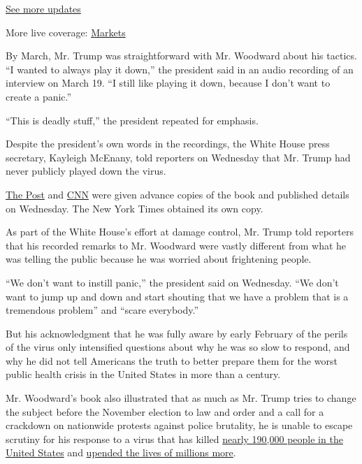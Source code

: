 \href{https://www.nytimes3xbfgragh.onion/2020/09/11/world/covid-19-coronavirus.html?action=click\&pgtype=Article\&state=default\&region=MAIN_CONTENT_1\&context=storylines_live_updates}{See
more updates}

More live coverage:
\href{https://www.nytimes3xbfgragh.onion/live/2020/09/11/business/stock-market-today-coronavirus?action=click\&pgtype=Article\&state=default\&region=MAIN_CONTENT_1\&context=storylines_live_updates}{Markets}

By March, Mr. Trump was straightforward with Mr. Woodward about his
tactics. ``I wanted to always play it down,'' the president said in an
audio recording of an interview on March 19. ``I still like playing it
down, because I don't want to create a panic.''

``This is deadly stuff,'' the president repeated for emphasis.

Despite the president's own words in the recordings, the White House
press secretary, Kayleigh McEnany, told reporters on Wednesday that Mr.
Trump had never publicly played down the virus.

\href{https://www.washingtonpost.com/politics/bob-woodward-rage-book-trump/2020/09/09/0368fe3c-efd2-11ea-b4bc-3a2098fc73d4_story.html}{The
Post} and
\href{https://www.cnn.com/2020/09/09/politics/bob-woodward-rage-book-trump-coronavirus/index.html}{CNN}
were given advance copies of the book and published details on
Wednesday. The New York Times obtained its own copy.

As part of the White House's effort at damage control, Mr. Trump told
reporters that his recorded remarks to Mr. Woodward were vastly
different from what he was telling the public because he was worried
about frightening people.

``We don't want to instill panic,'' the president said on Wednesday.
``We don't want to jump up and down and start shouting that we have a
problem that is a tremendous problem'' and ``scare everybody.''

But his acknowledgment that he was fully aware by early February of the
perils of the virus only intensified questions about why he was so slow
to respond, and why he did not tell Americans the truth to better
prepare them for the worst public health crisis in the United States in
more than a century.

Mr. Woodward's book also illustrated that as much as Mr. Trump tries to
change the subject before the November election to law and order and a
call for a crackdown on nationwide protests against police brutality, he
is unable to escape scrutiny for his response to a virus that has killed
\href{https://www.nytimes3xbfgragh.onion/interactive/2020/us/coronavirus-us-cases.html}{nearly
190,000 people in the United States} and
\href{https://www.nytimes3xbfgragh.onion/2020/05/14/business/economy/coronavirus-unemployment-claims.html}{upended
the lives of millions more}.

